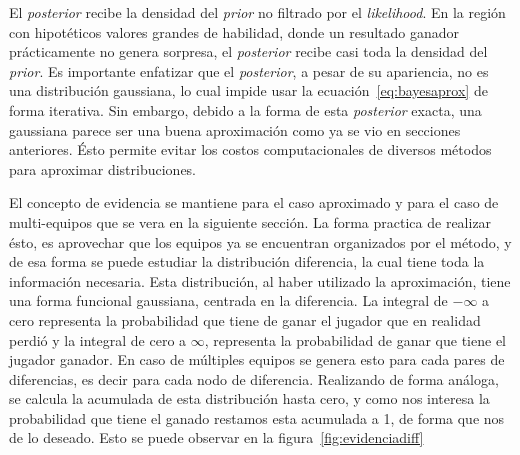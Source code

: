 \documentclass[11pt,twoside,spanish]{report} %
\begin{document}

El \textit{posterior} recibe la densidad del \textit{prior} no filtrado por el \textit{likelihood}.
En la regi\'on con hipot\'eticos valores grandes de habilidad, donde un resultado ganador pr\'acticamente no genera sorpresa, el \textit{posterior} recibe casi toda la densidad del \textit{prior}.
Es importante enfatizar que el \textit{posterior}, a pesar de su apariencia, no es una distribuci\'on gaussiana, lo cual impide usar la ecuaci\'on~\ref{eq:bayesaprox} de forma iterativa.
Sin embargo, debido a la forma de esta \textit{posterior} exacta, una gaussiana parece ser una buena aproximaci\'on como ya se vio en secciones anteriores.
\'Esto permite evitar los costos computacionales de diversos m\'etodos para aproximar distribuciones.

El concepto de evidencia se mantiene para el caso aproximado y para el caso de multi-equipos que se vera en la siguiente secci\'on.
La forma practica de realizar \'esto, es aprovechar que los equipos ya se encuentran organizados por el m\'etodo, y de esa forma se puede estudiar la distribuci\'on diferencia, la cual tiene toda la informaci\'on necesaria.
Esta distribuci\'on, al haber utilizado la aproximaci\'on, tiene una forma funcional gaussiana, centrada en la diferencia.
La integral de $-\infty$ a cero representa la probabilidad que tiene de ganar el jugador que en realidad perdi\'o y la integral de cero a  $\infty$, representa la probabilidad de ganar que tiene el jugador ganador.
En caso de m\'ultiples equipos se genera esto para cada pares de diferencias, es decir para cada nodo de diferencia.
Realizando de forma an\'aloga, se calcula la acumulada de esta distribuci\'on hasta cero, y como nos interesa la probabilidad que tiene el ganado restamos esta acumulada a 1, de forma que nos de lo deseado.
Esto se puede observar en la figura~\ref{fig:evidenciadiff}
\end{document}
